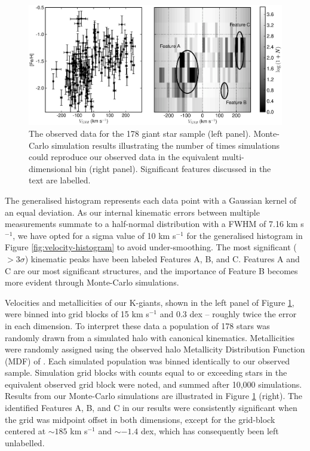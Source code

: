\documentclass[preprint2]{aastex}
\begin{document}
		\begin{figure}[t!]
		\includegraphics[width=\textwidth]{./monte_carlo.eps}
		\caption{The observed data for the 178 giant star sample (left panel). Monte-Carlo simulation results illustrating the number of times simulations could reproduce our observed data in the equivalent multi-dimensional bin (right panel). Significant features discussed in the text are labelled.}
		\label{fig:monte-carlo}
	\end{figure}
	

	
The generalised histogram represents each data point with a Gaussian kernel of an equal deviation. As our internal kinematic errors between multiple measurements summate to a half-normal distribution with a FWHM of 7.16 km s$^{-1}$, we have opted for a sigma value of 10 km s$^{-1}$ for the generalised histogram in Figure \ref{fig:velocity-histogram} to avoid under-smoothing. The most significant ($>3\sigma$) kinematic peaks have been labeled Features A, B, and C. Features A and C are our most significant structures, and the importance of Feature B becomes more evident through Monte-Carlo simulations. 



	Velocities and metallicities of our K-giants, shown in the left panel of Figure \ref{fig:monte-carlo}, were binned into grid blocks of 15 km s$^{-1}$ and 0.3 dex \--- roughly twice the error in each dimension. To interpret these data a population of 178 stars was randomly drawn from a simulated halo with canonical kinematics. Metallicities were randomly assigned using the observed halo Metallicity Distribution Function (MDF) of \citet{Ryan;Norris_1991}. Each simulated population was binned identically to our observed sample. Simulation grid blocks with counts equal to or exceeding stars in the equivalent observed grid block were noted, and summed after 10,000 simulations. Results from our Monte-Carlo simulations are illustrated in Figure \ref{fig:monte-carlo} (right). The identified Features A, B, and C in our results were consistently significant when the grid was midpoint offset in both dimensions, except for the grid-block centered at $\sim185$ km s$^{-1}$ and $\sim-1.4$ dex, which has consequently been left unlabelled.
	
\end{document}

